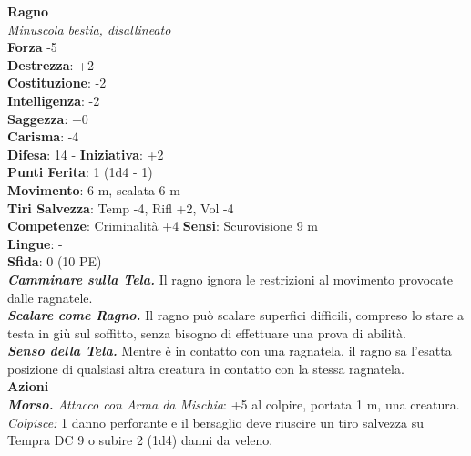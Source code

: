 \begin{multicols}{2}
\medskip\textbf{Ragno}\\
\emph{Minuscola bestia, disallineato}\\
\textbf{Forza} -5\\
\textbf{Destrezza}: +2\\
\textbf{Costituzione}: -2\\
\textbf{Intelligenza}: -2\\
\textbf{Saggezza}: +0\\
\textbf{Carisma}: -4\\
\textbf{Difesa}: 14 - \textbf{Iniziativa}: +2\\
\textbf{Punti Ferita}: 1 (1d4 - 1)\\
\textbf{Movimento}: 6 m, scalata 6 m\\
\textbf{Tiri Salvezza}: Temp -4, Rifl +2, Vol -4 \\
\textbf{Competenze}: Criminalità +4
\textbf{Sensi}: Scurovisione 9 m\\
\textbf{Lingue}: -\\
\textbf{Sfida}: 0 (10 PE)\smallskip\\

\emph{\textbf{Camminare sulla Tela.}} Il ragno ignora le restrizioni al movimento provocate dalle ragnatele.\\

\emph{\textbf{Scalare come Ragno.}} Il ragno può scalare superfici difficili, compreso lo stare a testa in giù sul soffitto, senza bisogno di effettuare una prova di abilità.\\

\emph{\textbf{Senso della Tela.}} Mentre è in contatto con una ragnatela, il ragno sa l'esatta posizione di qualsiasi altra creatura in contatto con la stessa ragnatela.\\

\smallskip\textbf{Azioni}\\

\emph{\textbf{Morso.} Attacco con Arma da Mischia}: +5 al colpire, portata 1 m, una creatura.\\

\emph{Colpisce:} 1 danno perforante e il bersaglio deve riuscire un tiro salvezza su Tempra DC 9 o subire 2 (1d4) danni da veleno.\\



\end{multicols}

